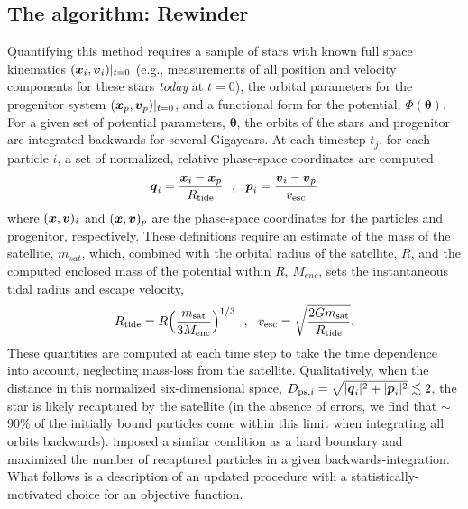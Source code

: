\subsection{The algorithm: Rewinder}
Quantifying this method requires a sample of stars with known full space
kinematics $(\boldsymbol{x}_{i}, \boldsymbol{v}_{i})|_{t=0}$ (e.g., measurements of all position
and velocity components for these stars \emph{today} at $t=0$), the orbital
parameters for the progenitor system $(\boldsymbol{x}_p, \boldsymbol{v}_p)|_{t=0}$, and a
functional form for the potential, $\Phi({\boldsymbol\theta})$. For a given set
of potential parameters, $\boldsymbol\theta$, the orbits of the stars and
progenitor are integrated backwards for several Gigayears. At each timestep
$t_j$, for each particle $i$, a set of normalized, relative phase-space
coordinates are computed
\begin{equation}
  \boldsymbol{q}_{i} = \frac{\boldsymbol{x}_{i} -
    \boldsymbol{x}_{p}}{R_{\rm tide}}\,\,\,\,,\,\,\,\,\boldsymbol{p}_{i} = \frac{\boldsymbol{v}_{i} -
    \boldsymbol{v}_{p}}{v_{\rm esc}}
\end{equation}
where $(\boldsymbol{x},\boldsymbol{v})_{i}$ and $(\boldsymbol{x},\boldsymbol{v})_{p}$ are the phase-space
coordinates for the particles and progenitor, respectively. These definitions
require an estimate of the mass of the satellite, $m_{sat}$, which, combined
with the orbital radius of the satellite, $R$, and the computed enclosed mass of
the potential within $R$, $M_{enc}$, sets the instantaneous tidal radius and
escape velocity,
\begin{equation}
  R_{\rm tide}=R\Big(\frac{m_{\rm sat}}{3M_{\rm enc}}\Big)^{1/3}\,\,\,\,,\,\,\,\,
  v_{\rm esc}=\sqrt{\frac{2Gm_{\rm sat}}{R_{\rm tide}}}.
\end{equation}
These quantities are computed at each time step to take the time dependence into
account, neglecting mass-loss from the satellite. Qualitatively, when the
distance in this normalized six-dimensional space, $D_{{\rm ps},i}=
\sqrt{|\boldsymbol{q}_{i}|^2+|\boldsymbol{p}_{i}|^2} \lesssim 2$, the star is likely recaptured
by the satellite (in the absence of errors, we find that $\sim$90\% of the
initially bound particles come within this limit when integrating all orbits
backwards). \citet{johnston99a} imposed a similar condition as a hard boundary
and maximized the number of recaptured particles in a given
backwards-integration. What follows is a description of an updated procedure
with a statistically-motivated choice for an objective function.

